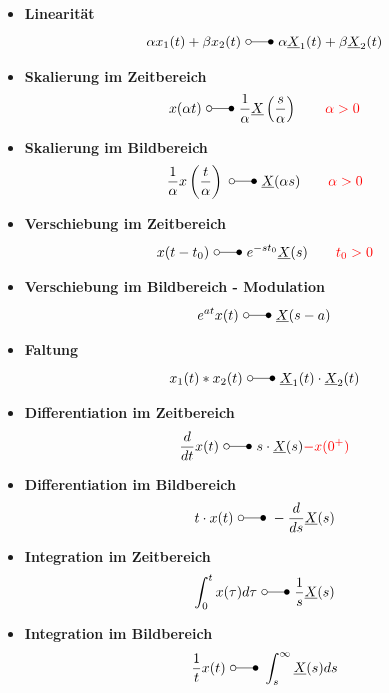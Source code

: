 \begin{mdframed}[style=exercise,nobreak=false]
	\begin{itemize}
		\item \textbf{Linearität}
		      \[
			      \alpha x_1(t) + \beta x_2(t) \ \laplace\  \alpha \underline{X}_1(t) + \beta \underline{X}_2(t)
		      \]
		      \vspace{-1.5em}
		\item \textbf{Skalierung im Zeitbereich}
		      \[
			      x(\alpha t) \ \laplace\  \frac{1}{\alpha} \underline{X}\left(\frac{s}{\alpha}\right) \qquad \color{red}{\alpha > 0}
		      \]
		      \vspace{-1.5em}
		\item \textbf{Skalierung im Bildbereich}
		      \[
			      \frac{1}{\alpha}x\left(\frac{t}{\alpha}\right)\ \laplace\ \underline{X}(\alpha s) \qquad \color{red}{\alpha > 0}
		      \]
		      \vspace{-1.5em}
		\item \textbf{Verschiebung im Zeitbereich}
		      \[
			      x(t-t_0)\ \laplace\ e^{-st_0} \underline{X}(s) \qquad \color{red}{t_0 > 0}
		      \]
		      \vspace{-1.5em}
		\item \textbf{Verschiebung im Bildbereich - Modulation}
		      \[
			      e^{at}x(t) \ \laplace\ \underline{X}(s-a)
		      \]
		      \vspace{-1.5em}
		\item \textbf{Faltung}
		      \[
			      x_1(t)*x_2(t) \ \laplace\ \underline{X}_1(t)\cdot \underline{X}_2(t)
		      \]
		      \vspace{-1.5em}
		\item \textbf{Differentiation im Zeitbereich}
		      \[
			      \frac{d}{dt}x(t) \ \laplace\ s\cdot\underline{X}(s)\color{red}{-x(0^+)}
		      \]
		      \vspace{-1.5em}
		\item \textbf{Differentiation im Bildbereich}
		      \[
			      t\cdot x(t) \ \laplace\ -\frac{d}{ds}\underline{X}(s)
		      \]
		      \vspace{-1.5em}
		\item \textbf{Integration im Zeitbereich}
		      \[
			      \int_0^t x(\tau)d\tau \ \laplace\ \frac{1}{s}\underline{X}(s)
		      \]
		      \vspace{-1.5em}
		\item \textbf{Integration im Bildbereich}
		      \[
			      \frac{1}{t}x(t) \ \laplace\ \int_s^\infty\underline{X}(s)ds
		      \]
	\end{itemize}
\end{mdframed}
